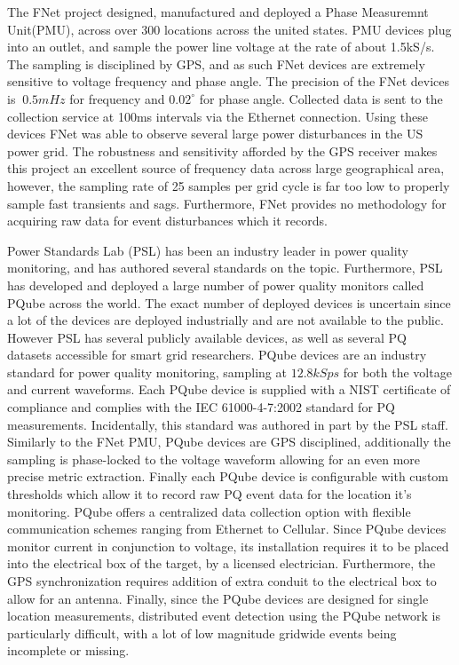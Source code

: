 The FNet project designed, manufactured and deployed a Phase Measuremnt Unit(PMU), across over 300 locations across the united states.\cite{zhang2010wide} PMU devices plug into an outlet, and sample the power line voltage at the rate of about 1.5kS/s. The sampling is disciplined by GPS, and as such FNet devices are extremely sensitive to voltage frequency and phase angle. The precision of the FNet devices is $~0.5mHz$ for frequency and $0.02^{\circ}$ for phase angle. Collected data is sent to the collection service at 100ms intervals via the Ethernet connection. Using these devices FNet was able to observe several large power disturbances in the US power grid. The robustness and sensitivity afforded by the GPS receiver makes this project an excellent source of frequency data across large geographical area, however,  the sampling rate of 25 samples per grid cycle is far too low to properly sample fast transients and sags. Furthermore, FNet provides no methodology for acquiring raw data for event disturbances which it records.

Power Standards Lab (PSL) has been an industry leader in power quality monitoring, and has authored several standards on the topic. Furthermore, PSL has developed and deployed a large number of power quality monitors called PQube across the world. The exact number of deployed devices is uncertain since a lot of the devices are deployed industrially and are not available to the public. However PSL has several publicly available devices, as well as several PQ datasets accessible for smart grid researchers. PQube devices are an industry standard for power quality monitoring, sampling at $12.8kSps$ for both the voltage and current waveforms.\cite{pqube_spec} Each PQube device is supplied with a NIST certificate of compliance and complies with the IEC 61000-4-7:2002 standard for PQ measurements. Incidentally, this standard was authored in part by the PSL staff. Similarly to the FNet PMU, PQube devices are GPS disciplined, additionally the sampling is phase-locked to the voltage waveform allowing for an even more precise metric extraction. Finally each PQube device is configurable with custom thresholds which allow it to record raw PQ event data for the location it's monitoring. PQube offers a centralized data collection option with flexible communication schemes ranging from Ethernet to Cellular. Since PQube devices monitor current in conjunction to voltage, its installation requires it to be placed into the electrical box of the target, by a licensed electrician.\cite{von2014micro} Furthermore, the GPS synchronization requires addition of extra conduit to the electrical box to allow for an antenna. Finally, since the PQube devices are designed for single location measurements, distributed event detection using the PQube network is particularly difficult, with a lot of low magnitude gridwide events being incomplete or missing. 

